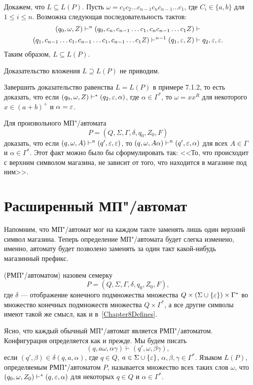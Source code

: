 \begin{myexample}
Докажем, что $L\subseteq L(P)$. Пусть $\omega=c_1c_2\ldots c_{n-1}c_nc_{n-1}\ldots c_1$, где $C_i\in\{a,b\}$ для $1\le i\le n$. Возможна следующая последовательность тактов:
\begin{multline*}
(q_0,\omega,Z) \vdash^n (q_0,c_n,c_{n-1}\ldots c_1,c_nc_{n-1}\ldots c_1Z) \vdash \\ (q_1,c_{n-1}\ldots c_1,c_{n-1}\ldots c_1,c_{n-1}\ldots c_1Z) \vdash^{n-1} (q_1,\varepsilon,Z) \vdash {q_2,\varepsilon,\varepsilon}.
\end{multline*}
Таким образом, $L\subseteq L(P)$.

Доказательство вложения $L\supseteq L(P)$ не приводим.
\end{myexample}

\begin{myproblem}
Завершить доказательство равенства $L=L(P)$ в примере 7.1.2, то есть доказать, что если $(q_0,\omega,Z)\vdash^*(q_2,\varepsilon,\alpha)$, где $\alpha\in\Gamma^*$, то $\omega=xx^R$ для некоторого $x\in(a+b)^+$ и $\alpha=\varepsilon$.
\end{myproblem}

\begin{myproblem}
Для произвольного МП"/автомата
\[
P=(Q,\Sigma,\Gamma,\delta,q_0,Z_0,F)
\]
доказать, что если $(q,\omega,A)\vdash^n(q',\varepsilon,\varepsilon)$, то $(q,\omega,A\alpha)\vdash^n(q',\varepsilon,\alpha)$ для всех $A\in\Gamma$ и $\alpha\in\Gamma^*$. Этот факт можно было бы сформулировать так: <<То, что происходит с верхним символом магазина, не зависит от того, что находится в магазине под ним>>.
\end{myproblem}

\section{Расширенный МП"/автомат}
\label{Chapter8FSMSMVariants}

Напомним, что МП"/автомат мог на каждом такте заменять лишь один верхний символ магазина. Теперь определение МП"/автомата будет слегка изменено, именно, автомату будет позволено заменять за один такт какой-нибудь магазинный префикс.

 (РМП"/автоматом) назовем семерку
\[
P=(Q,\Sigma,\Gamma,\delta,q_0,Z_0,F),
\]
где $\delta$ --- отображение конечного подмножества множества
$Q\times(\Sigma\cup\{\varepsilon\})\times\Gamma^*$ во множество конечных подмножеств множества $Q\times\Gamma^*$, а все другие символы имеют такой же смысл, как и в~\ref{Chapter8Defines}.

Ясно, что каждый обычный МП"/автомат является РМП"/автоматом. Конфигурация определяется как и прежде. Мы будем писать
\[
(q,a\omega,\alpha\gamma)\vdash(q',\omega,\beta\gamma),
\]
если $(q',\beta)\in\delta(q,a,\alpha)$, где $q\in Q$, $a\in\Sigma\cup\{\varepsilon\}$, $\alpha,  \beta, \gamma\in\Gamma^*$. Языком $L(P)$, определяемым РМП"/автоматом $P$, называется множество всех таких слов $\omega$, что $(q_0,\omega,Z_0)\vdash^*(q,\varepsilon,\alpha)$ для некоторых $q\in Q$ и $\alpha \in\Gamma^*$.

